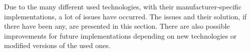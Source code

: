 Due to the many different used technologies, with their manufacturer-specific implementations, a lot of issues have occurred. The issues and their solution, if there have been any, are presented in this section. There are also possible improvements for future implementations depending on new technologies or modified versions of the used ones.






